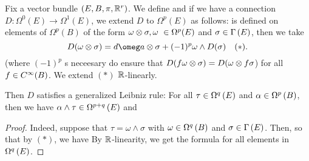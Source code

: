 \documentclass[main.tex]{subfiles}
\begin{document}
   Fix a vector bundle $(E, B, \pi, \mathbb{R}^r)$. We define
  and if we have a connection $D: \Omega^0(E) \to \Omega^1(E)$, we extend $D$ to $\Omega^p(E)$ as follows:
  is defined on elements of $\Omega^p(B)$ of the form $\omega \otimes \sigma, \omega\ \in \Omega^p(E)$ and $\sigma \in \Gamma\left( E \right)$, then we take
  \[
  D(\omega \ot \sigma ) = d\omeg a\ot \sigma + (-1)^p \omega \wedge D(\sigma) \hspace{1em} (*).
  \]
  (where $(-1)^p$ s neceesary do ensure that $D(f\omega \otimes \sigma) = D(\omega \otimes f\sigma$) for all $f \in C^\infty(B)$. We extend $(*)$ $\mathbb{R}$-linearly.

  Then $D$ satisfies a generalized Leibniz rule: For all $\tau \in \Omega^{q}\left( E \right)$ and $\alpha \in \Omega^{p}\left( B \right)$, then we have $\alpha \wedge \tau \in \Omega^{p+q}\left( E \right)$ and
\begin{proof}

  Indeed, suppose that $\tau = \omega \wedge \sigma$ with $\omega \in \Omega^{q}\left( B \right)$ and $\sigma \in \Gamma\left( E \right)$. Then,
  \al{
    \alpha \wedge \tau &= \alpha \wedge (\omega \ot \sigma) \\
                      &= (\alpha \wedge \omega) \ot \sigma,
  }
  so that by $(*)$, we have
  By $\mathbb{R}$-linearity, we get the formula for all elements in $\Omega^{q}\left( E \right)$.
\end{proof}
\end{document}
